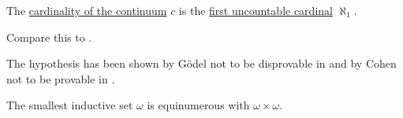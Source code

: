 \begin{conjecture}\label{hyp:continuum_hypothesis}
  The \hyperref[def:set_countability/continuum]{cardinality of the continuum} \( c \) is the \hyperref[def:set_countability/uncountable]{first uncountable cardinal} \( \aleph_1 \).
\end{conjecture}
\begin{comments}
  \item Compare this to .
  \item The hypothesis has been shown by G\"odel not to be disprovable in \hyperref[def:set]{} and by Cohen not to be provable in .
\end{comments}

\begin{proposition}\label{thm:omega_equinumerous_with_omega_squared}
  The smallest inductive set \( \omega \) is equinumerous with \( \omega \times \omega \).
\end{proposition}
